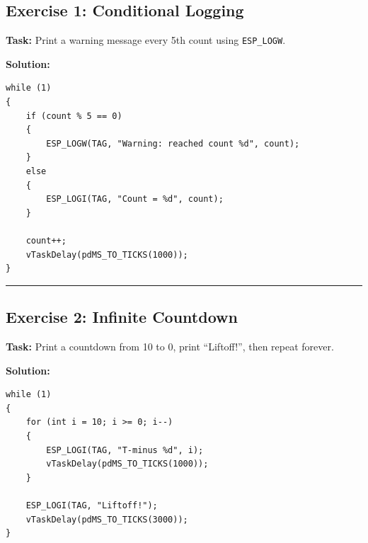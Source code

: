 \documentclass[11pt]{article}
\begin{document}
\subsection*{Exercise 1: Conditional Logging}
\textbf{Task:} Print a warning message every 5th count using \texttt{ESP\_LOGW}.

\textbf{Solution:}
\begin{verbatim}
while (1)
{
    if (count % 5 == 0)
    {
        ESP_LOGW(TAG, "Warning: reached count %d", count);
    }
    else
    {
        ESP_LOGI(TAG, "Count = %d", count);
    }

    count++;
    vTaskDelay(pdMS_TO_TICKS(1000));
}
\end{verbatim}

\bigskip
\noindent\rule{\textwidth}{0.4pt}
\bigskip

\subsection*{Exercise 2: Infinite Countdown}
\textbf{Task:} Print a countdown from 10 to 0, print ``Liftoff!'', then repeat forever.

\textbf{Solution:}
\begin{verbatim}
while (1)
{
    for (int i = 10; i >= 0; i--)
    {
        ESP_LOGI(TAG, "T-minus %d", i);
        vTaskDelay(pdMS_TO_TICKS(1000));
    }

    ESP_LOGI(TAG, "Liftoff!");
    vTaskDelay(pdMS_TO_TICKS(3000));
}
\end{verbatim}
\end{document}
